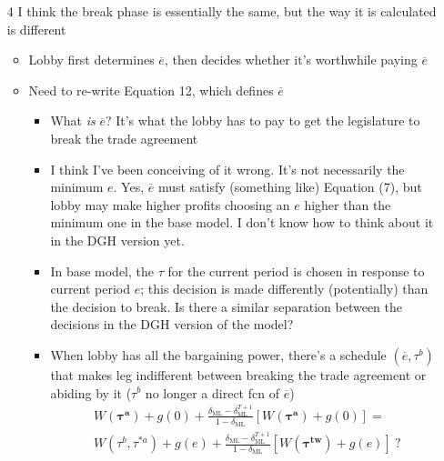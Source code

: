 \documentclass[12pt]{article}
\newcommand{\ov}{\overline}
\newcommand{\bta}{\bm{\tau^a}}
\newcommand{\btw}{\bm{\tau^{tw}}}
\newcommand{\de}{\delta}
\begin{document}
\begin{itemize}
\begin{itemize}
			\item[4] I think the break phase is essentially the same, but the way it is calculated is different
				\begin{itemize}
					\item Lobby first determines $\ov{e}$, then decides whether it's worthwhile paying $\ov{e}$
					\item Need to re-write Equation 12, which defines $\ov{e}$
						\begin{itemize}	
							\item What \textit{is} $\ov{e}$? It's what the lobby has to pay to get the legislature to break the trade agreement
							\item I think I've been conceiving of it wrong. It's not necessarily the minimum $e$. Yes, $\ov{e}$ must satisfy (something like) Equation (7), but lobby may make higher profits choosing an $e$ higher than the minimum one in the base model. I don't know how to think about it in the DGH version yet.
							\item In base model, the $\tau$ for the current period is chosen in response to current period $e$; this decision is made differently (potentially) than the decision to break. Is there a similar separation between the decisions in the DGH version of the model?
							\item When lobby has all the bargaining power, there's a schedule $(\ov{e},\tau^b)$ that makes leg indifferent between breaking the trade agreement or abiding by it ($\tau^b$ no longer a direct fcn of $\ov{e}$)
								\begin{multline*}
									W(\bta) + g(0) + \frac{\de_\text{ML} - \de_\text{ML}^{T+1}}{1-\de_\text{ML}}\left[W(\bta) + g(0)\right] = \\
	W(\tau^b,\tau^{*a}) +g(e) + \frac{\de_\text{ML} - \de_\text{ML}^{T+1}}{1-\de_\text{ML}} \left[W(\btw) + g(e)\right] \ ?
								\end{multline*}
						\end{itemize}
				\end{itemize}
		\end{itemize}
\end{itemize}
\end{document}
